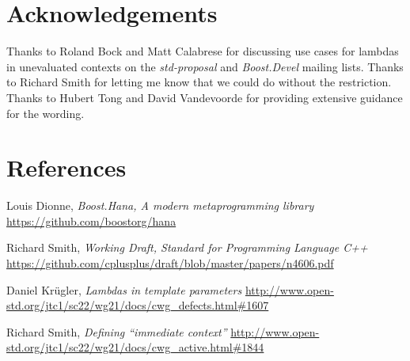 \documentclass[11pt]{article}
\begin{document}
\section{Acknowledgements}
Thanks to Roland Bock and Matt Calabrese for discussing use cases for lambdas
in unevaluated contexts on the \textit{std-proposal} and \textit{Boost.Devel}
mailing lists. Thanks to Richard Smith for letting me know that we could do
without the restriction. Thanks to Hubert Tong and David Vandevoorde for
providing extensive guidance for the wording.


\section{References}
\renewcommand{\section}[2]{}%
\begin{thebibliography}{9}

    Louis Dionne,
    \emph{Boost.Hana, A modern metaprogramming library}\newline
    \url{https://github.com/boostorg/hana}

    Richard Smith,
    \emph{Working Draft, Standard for Programming Language C++}\newline
    \url{https://github.com/cplusplus/draft/blob/master/papers/n4606.pdf}

    Daniel Kr{\"u}gler,
    \emph{Lambdas in template parameters}\newline
    \url{http://www.open-std.org/jtc1/sc22/wg21/docs/cwg_defects.html#1607}

    Richard Smith,
    \emph{Defining “immediate context”}\newline
    \url{http://www.open-std.org/jtc1/sc22/wg21/docs/cwg_active.html#1844}

\end{thebibliography}
\end{document}
